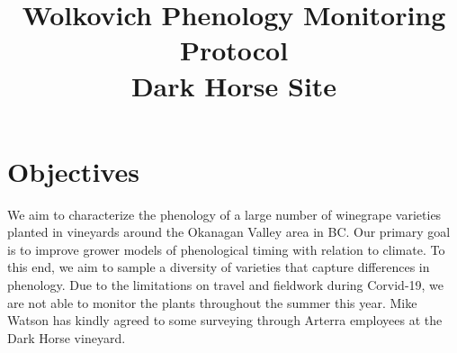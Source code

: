 \documentclass[11pt,letter]{article}
\begin{document}

\renewcommand{\refname}{\CHead{}}

\title{Wolkovich Phenology Monitoring Protocol\\
Dark Horse Site}
\date{ }
\maketitle
\tableofcontents

\section{Objectives}
We aim to characterize the phenology of a large number of winegrape varieties planted in vineyards around the Okanagan Valley area in BC. Our primary goal is to improve grower models of phenological timing with relation to climate. To this end, we aim to sample a diversity of varieties that capture differences in phenology. Due to the limitations on travel and fieldwork during Corvid-19, we are not able to monitor the plants throughout the summer this year. Mike Watson has kindly agreed to some surveying through Arterra employees at the Dark Horse vineyard.
\end{document}
